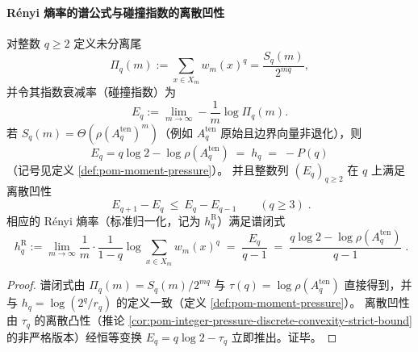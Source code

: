 \paragraph{Rényi 熵率的谱公式与碰撞指数的离散凹性}
\begin{corollary}\label{cor:pom-renyi-rate-spectral-formula-discrete-concavity}
对整数 \(q\ge 2\) 定义未分离尾
\[
\Pi_q(m):=\sum_{x\in X_m}w_m(x)^q=\frac{S_q(m)}{2^{mq}},
\]
并令其指数衰减率（碰撞指数）为
\[
E_q:=\lim_{m\to\infty}-\frac{1}{m}\log \Pi_q(m).
\]
若 \(S_q(m)=\Theta(\rho(A_q^{\mathrm{ten}})^m)\)（例如 \(A_q^{\mathrm{ten}}\) 原始且边界向量非退化），则
\[
\boxed{\;
E_q=q\log 2-\log\rho(A_q^{\mathrm{ten}})\;=\;h_q\;=\;-P(q)\; }
\]
（记号见定义 \ref{def:pom-moment-pressure}）。
并且整数列 \((E_q)_{q\ge 2}\) 在 \(q\) 上满足离散凹性
\[
\boxed{\;
E_{q+1}-E_q\ \le\ E_q-E_{q-1}\qquad(q\ge 3)\; }.
\]
相应的 Rényi 熵率（标准归一化，记为 \(h_q^{\mathrm R}\)）满足谱闭式
\[
\boxed{\;
h_q^{\mathrm R}
:=\lim_{m\to\infty}\frac{1}{m}\cdot\frac{1}{1-q}\log\sum_{x\in X_m}w_m(x)^q
\;=\;\frac{E_q}{q-1}
\;=\;\frac{q\log 2-\log\rho(A_q^{\mathrm{ten}})}{q-1}\; }.
\]
\end{corollary}
\begin{proof}
谱闭式由 \(\Pi_q(m)=S_q(m)/2^{mq}\) 与 \(\tau(q)=\log\rho(A_q^{\mathrm{ten}})\) 直接得到，并与 \(h_q=\log(2^q/r_q)\) 的定义一致（定义 \ref{def:pom-moment-pressure}）。
离散凹性由 \(\tau_q\) 的离散凸性（推论 \ref{cor:pom-integer-pressure-discrete-convexity-strict-bound} 的非严格版本）经恒等变换 \(E_q=q\log2-\tau_q\) 立即推出。证毕。
\end{proof}

